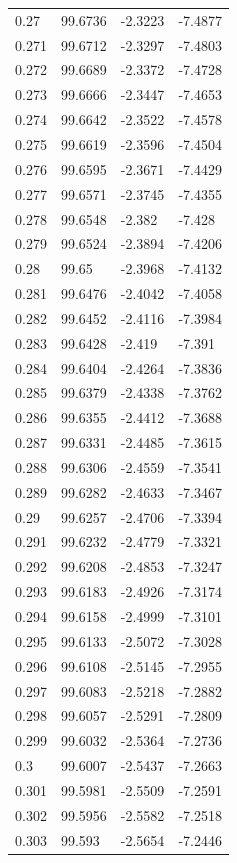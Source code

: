 \begin{tabular}{llll}
0.27 & 99.6736 & -2.3223 & -7.4877 \\
0.271 & 99.6712 & -2.3297 & -7.4803 \\
0.272 & 99.6689 & -2.3372 & -7.4728 \\
0.273 & 99.6666 & -2.3447 & -7.4653 \\
0.274 & 99.6642 & -2.3522 & -7.4578 \\
0.275 & 99.6619 & -2.3596 & -7.4504 \\
0.276 & 99.6595 & -2.3671 & -7.4429 \\
0.277 & 99.6571 & -2.3745 & -7.4355 \\
0.278 & 99.6548 & -2.382 & -7.428 \\
0.279 & 99.6524 & -2.3894 & -7.4206 \\
0.28 & 99.65 & -2.3968 & -7.4132 \\
0.281 & 99.6476 & -2.4042 & -7.4058 \\
0.282 & 99.6452 & -2.4116 & -7.3984 \\
0.283 & 99.6428 & -2.419 & -7.391 \\
0.284 & 99.6404 & -2.4264 & -7.3836 \\
0.285 & 99.6379 & -2.4338 & -7.3762 \\
0.286 & 99.6355 & -2.4412 & -7.3688 \\
0.287 & 99.6331 & -2.4485 & -7.3615 \\
0.288 & 99.6306 & -2.4559 & -7.3541 \\
0.289 & 99.6282 & -2.4633 & -7.3467 \\
0.29 & 99.6257 & -2.4706 & -7.3394 \\
0.291 & 99.6232 & -2.4779 & -7.3321 \\
0.292 & 99.6208 & -2.4853 & -7.3247 \\
0.293 & 99.6183 & -2.4926 & -7.3174 \\
0.294 & 99.6158 & -2.4999 & -7.3101 \\
0.295 & 99.6133 & -2.5072 & -7.3028 \\
0.296 & 99.6108 & -2.5145 & -7.2955 \\
0.297 & 99.6083 & -2.5218 & -7.2882 \\
0.298 & 99.6057 & -2.5291 & -7.2809 \\
0.299 & 99.6032 & -2.5364 & -7.2736 \\
0.3 & 99.6007 & -2.5437 & -7.2663 \\
0.301 & 99.5981 & -2.5509 & -7.2591 \\
0.302 & 99.5956 & -2.5582 & -7.2518 \\
0.303 & 99.593 & -2.5654 & -7.2446 \\

\end{tabular}

